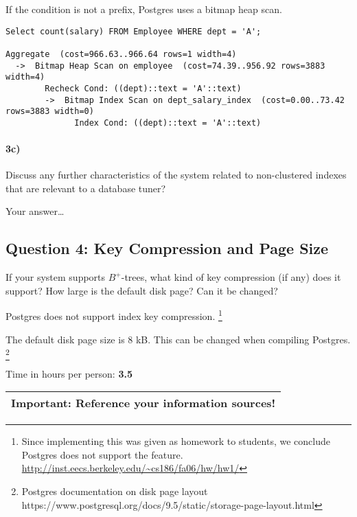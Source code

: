 \documentclass[11pt]{scrartcl}
\begin{document}
If the condition is not a prefix, Postgres uses a bitmap heap scan.

{\small
\begin{verbatim}
Select count(salary) FROM Employee WHERE dept = 'A';

Aggregate  (cost=966.63..966.64 rows=1 width=4)
  ->  Bitmap Heap Scan on employee  (cost=74.39..956.92 rows=3883 width=4)
        Recheck Cond: ((dept)::text = 'A'::text)
        ->  Bitmap Index Scan on dept_salary_index  (cost=0.00..73.42 rows=3883 width=0)
              Index Cond: ((dept)::text = 'A'::text)
\end{verbatim}
}

\paragraph{3c)} Discuss any further characteristics of the system related to
non-clustered indexes that are relevant to a database tuner?

\smallskip

Your answer\dots

\subsection*{Question 4: Key Compression and Page Size} If your system
supports $B^+$-trees, what kind of key compression (if any) does it
support?  How large is the default disk page? Can it be changed?


\vspace{1em}
Postgres does not support index key compression.
\footnote{Since implementing this was given as homework to students,
we conclude Postgres does not support the feature.
\url{http://inst.eecs.berkeley.edu/~cs186/fa06/hw/hw1/}}

The default disk page size is 8 kB. This can be changed when compiling
Postgres.
\footnote{Postgres documentation on disk page layout 
https://www.postgresql.org/docs/9.5/static/storage-page-layout.html}

\bigskip

\noindent Time in hours per person: {\bf 3.5}

\bigskip

\begin{center}
  \begin{tabular}{c}
    \hline
    {\bf Important:} Reference your information sources!
    \\\hline
  \end{tabular}
\end{center}
\end{document}
